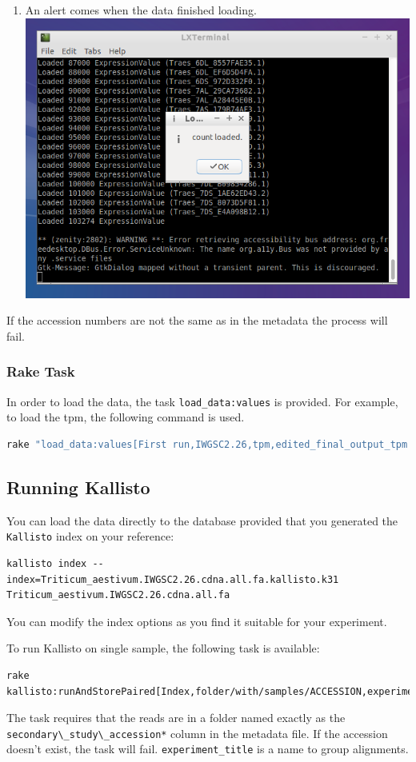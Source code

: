\begin{enumerate}
\item
  An alert comes when the data finished loading.
  \includegraphics{images/LoadValues06.png}
\end{enumerate}

If the accession numbers are not the same as in the metadata the process
will fail.

\subsubsection{Rake Task}\label{rake-task}

In order to load the data, the task \lstinline!load_data:values! is
provided. For example, to load the tpm, the following command is used.

\begin{lstlisting}[language=sh]
rake "load_data:values[First run,IWGSC2.26,tpm,edited_final_output_tpm.txt]"
\end{lstlisting}

\subsection{Running Kallisto}\label{running-kallisto}

You can load the data directly to the database provided that you
generated the \lstinline!Kallisto! index on your reference:

\begin{lstlisting}
kallisto index --index=Triticum_aestivum.IWGSC2.26.cdna.all.fa.kallisto.k31 Triticum_aestivum.IWGSC2.26.cdna.all.fa
\end{lstlisting}

You can modify the index options as you find it suitable for your
experiment.

To run Kallisto on single sample, the following task is available:

\begin{lstlisting}
rake kallisto:runAndStorePaired[Index,folder/with/samples/ACCESSION,experiment_title,IWGSC2.26]
\end{lstlisting}

The task requires that the reads are in a folder named exactly as the
\lstinline!secondary\_study\_accession*! column in the metadata file. If
the accession doesn't exist, the task will fail.
\lstinline!experiment_title! is a name to group alignments.
